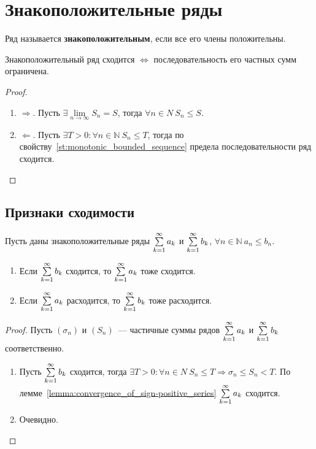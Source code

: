 \section{Знакоположительные ряды}
 Ряд называется \textbf{знакоположительным}, если все его члены положительны.

\begin{lemma}
\label{lemma:convergence_of_sign-positive_series}
Знакоположительный ряд сходится $\Leftrightarrow$ последовательность его частных сумм ограничена.
\end{lemma}
\begin{proof}
\begin{enumerate}
	\item $\Rightarrow$. Пусть $\exists \lim\limits_{n \to \infty} S_n = S$, тогда $\forall n \in N \ S_n \leqslant S$.
	\item $\Leftarrow$. Пусть $\exists T > 0 \colon \forall n \in \mathbb N \ S_n \leqslant T$, тогда по свойству~\ref{st:monotonic_bounded_sequence} предела последовательности ряд сходится.
\end{enumerate}
\end{proof}

\subsection{Признаки сходимости}
\begin{theorem}
Пусть даны знакоположительные ряды $\series a_k$ и $\series b_k$, $\forall n \in \mathbb N \ a_n \leqslant b_n$.
\begin{enumerate}
	\item Если $\series b_k$ сходится, то $\series a_k$ тоже сходится.
	\item Если $\series a_k$ расходится, то $\series b_k$ тоже расходится.
\end{enumerate}
\end{theorem}
\begin{proof}
Пусть $(\sigma_n)$ и $(S_n)$~--- частичные суммы рядов $\series a_k$ и $\series b_k$ соответственно.
\begin{enumerate}
	\item Пусть $\series b_k$ сходится, тогда $\exists T > 0 \colon \forall n \in N \ S_n \leqslant T \Rightarrow
	\sigma_n \leqslant S_n < T$.
	По лемме~\ref*{lemma:convergence_of_sign-positive_series} $\series a_k$ сходится.
	
	\item Очевидно.
\end{enumerate}
\end{proof}

